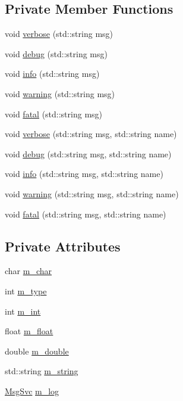 \subsection*{Private Member Functions}
\begin{DoxyCompactItemize}
\item 
void \hyperlink{classvar_a3e079680ce51addea659b23d303ceedc}{verbose} (std::string msg)
\item 
void \hyperlink{classvar_a90d3b799c7953db985d7488de79e247d}{debug} (std::string msg)
\item 
void \hyperlink{classvar_a6ad63ffe8ea9495201a7b2a824547518}{info} (std::string msg)
\item 
void \hyperlink{classvar_a56b3d498264760e7b1212d204e6a49d4}{warning} (std::string msg)
\item 
void \hyperlink{classvar_a2f23892af2d80d27ebb8032f89d875f2}{fatal} (std::string msg)
\item 
void \hyperlink{classvar_a381db77de9128014c9ddb5cfc7793f65}{verbose} (std::string msg, std::string name)
\item 
void \hyperlink{classvar_afe9c80c1fab5c210a628bb29df513935}{debug} (std::string msg, std::string name)
\item 
void \hyperlink{classvar_a52f41c560b167041c7d4e17a42021d5c}{info} (std::string msg, std::string name)
\item 
void \hyperlink{classvar_af8e180a414b085d50d35ba585bf7717f}{warning} (std::string msg, std::string name)
\item 
void \hyperlink{classvar_af190a03a038835391edf1b1173e117ab}{fatal} (std::string msg, std::string name)
\end{DoxyCompactItemize}
\subsection*{Private Attributes}
\begin{DoxyCompactItemize}
\item 
char \hyperlink{classvar_afffb29be23233ae232502023719da1d3}{m\_\-char}
\item 
int \hyperlink{classvar_afd0bde61955d8a7541d3dcedc22ec2ad}{m\_\-type}
\item 
int \hyperlink{classvar_a2796c70baa395a5e2c5457df760249d7}{m\_\-int}
\item 
float \hyperlink{classvar_adb803c54ed2edb812a77241d511385e6}{m\_\-float}
\item 
double \hyperlink{classvar_ad8590162a1dae61824b874c615cce311}{m\_\-double}
\item 
std::string \hyperlink{classvar_a81567a7f3af11ceee9a0624648e0e904}{m\_\-string}
\item 
\hyperlink{classMsgSvc}{MsgSvc} \hyperlink{classvar_a5dfdc5180270038b686ad3013874a026}{m\_\-log}
\end{DoxyCompactItemize}


